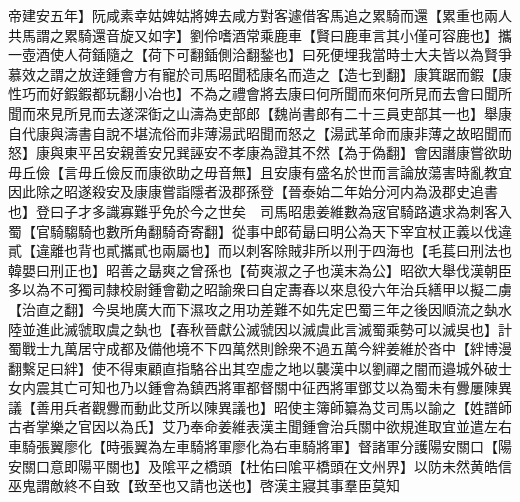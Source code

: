帝建安五年】阮咸素幸姑婢姑將婢去咸方對客遽借客馬追之累騎而還【累重也兩人共馬謂之累騎還音旋又如字】劉伶嗜酒常乘鹿車【賢曰鹿車言其小僅可容鹿也】攜一壺酒使人荷鍤隨之【荷下可翻鍤側洽翻鍫也】曰死便埋我當時士大夫皆以為賢爭慕效之謂之放逹鍾會方有寵於司馬昭聞嵇康名而造之【造七到翻】康箕踞而鍜【康性巧而好鍜鍜都玩翻小冶也】不為之禮會將去康曰何所聞而來何所見而去會曰聞所聞而來見所見而去遂深衘之山濤為吏部郎【魏尚書郎有二十三員吏部其一也】舉康自代康與濤書自說不堪流俗而非薄湯武昭聞而怒之【湯武革命而康非薄之故昭聞而怒】康與東平呂安親善安兄巽誣安不孝康為證其不然【為于偽翻】會因譖康嘗欲助毋丘儉【言毋丘儉反而康欲助之毋音無】且安康有盛名於世而言論放蕩害時亂教宜因此除之昭遂殺安及康康嘗詣隱者汲郡孫登【晉泰始二年始分河内為汲郡史追書也】登曰子才多識寡難乎免於今之世矣　司馬昭患姜維數為宼官騎路遺求為刺客入蜀【官騎騶騎也數所角翻騎奇寄翻】從事中郎荀朂曰明公為天下宰宜杖正義以伐違貳【違離也背也貳攜貳也兩屬也】而以刺客除賊非所以刑于四海也【毛萇曰刑法也韓嬰曰刑正也】昭善之朂爽之曾孫也【荀爽淑之子也漢末為公】昭欲大舉伐漢朝臣多以為不可獨司隸校尉鍾會勸之昭諭衆曰自定夀春以來息役六年治兵繕甲以擬二虜【治直之翻】今吳地廣大而下濕攻之用功差難不如先定巴蜀三年之後因順流之埶水陸並進此滅虢取虞之埶也【春秋晉獻公滅虢因以滅虞此言滅蜀乘勢可以滅吳也】計蜀戰士九萬居守成都及備他境不下四萬然則餘衆不過五萬今絆姜維於沓中【絆博漫翻繫足曰絆】使不得東顧直指駱谷出其空虚之地以襲漢中以劉禪之闇而邉城外破士女内震其亡可知也乃以鍾會為鎮西將軍都督關中征西將軍鄧艾以為蜀未有釁屢陳異議【善用兵者觀釁而動此艾所以陳異議也】昭使主簿師纂為艾司馬以諭之【姓譜師古者掌樂之官因以為氏】艾乃奉命姜維表漢主聞鍾會治兵關中欲規進取宜並遣左右車騎張翼廖化【時張翼為左車騎將軍廖化為右車騎將軍】督諸軍分護陽安關口【陽安關口意即陽平關也】及隂平之橋頭【杜佑曰隂平橋頭在文州界】以防未然黄皓信巫鬼謂敵終不自致【致至也又請也送也】啓漢主寢其事羣臣莫知

